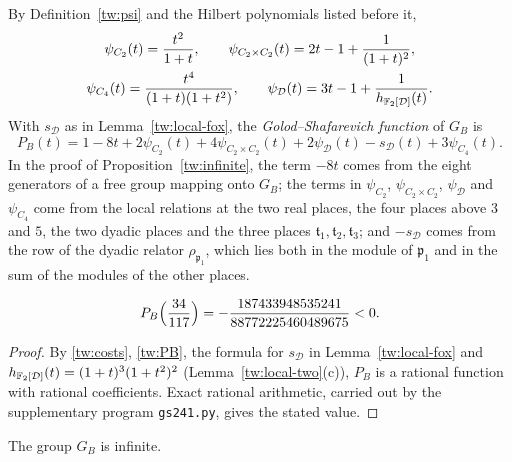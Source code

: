 By Definition~\ref{tw:psi} and the Hilbert polynomials listed before it,
\begin{equation}\label{tw:costs}
\begin{gathered}
 \psi_{C_2}(t)=\frac{t^2}{1+t},\qquad
 \psi_{C_2\times C_2}(t)=2t-1+\frac1{(1+t)^2},\\
 \psi_{C_4}(t)=\frac{t^4}{(1+t)(1+t^2)},\qquad
 \psi_{\mathcal D}(t)=3t-1+\frac1{h_{\mathbb F_2[\mathcal D]}(t)}.
\end{gathered}
\end{equation}
With $s_{\mathcal D}$ as in Lemma~\ref{tw:local-fox}, the \emph{Golod--Shafarevich
function} of $G_B$ is
\begin{equation}\label{tw:PB}
 P_B(t)=1-8t+2\psi_{C_2}(t)+4\psi_{C_2\times C_2}(t)+2\psi_{\mathcal D}(t)-s_{\mathcal D}(t)
 +3\psi_{C_4}(t).
\end{equation}
In the proof of Proposition~\ref{tw:infinite}, the term $-8t$ comes from the
eight generators of a free group mapping onto $G_B$; the terms in
$\psi_{C_2}$, $\psi_{C_2\times C_2}$, $\psi_{\mathcal D}$ and $\psi_{C_4}$ come from the
local relations at the two real places, the four places above $3$ and $5$,
the two dyadic places and the three places
$\mathfrak t_1,\mathfrak t_2,\mathfrak t_3$; and $-s_{\mathcal D}$ comes from the row of
the dyadic relator $\rho_{\mathfrak p_1}$, which lies both in the module of
$\mathfrak p_1$ and in the sum of the modules of the other places.

\begin{lemma}\label{tw:PB-value}
\[
 P_B\Bigl(\frac{34}{117}\Bigr)=-\frac{187433948535241}{88772225460489675}<0.
\]
\end{lemma}

\begin{proof}
By \eqref{tw:costs}, \eqref{tw:PB}, the formula for $s_{\mathcal D}$ in
Lemma~\ref{tw:local-fox} and $h_{\mathbb F_2[\mathcal D]}(t)=(1+t)^3(1+t^2)^2$
(Lemma~\ref{tw:local-two}(c)), $P_B$ is a rational function with rational
coefficients. Exact rational arithmetic, carried out by the supplementary
program \texttt{gs241.py}, gives the stated value.
\end{proof}

\begin{proposition}\label{tw:infinite}
The group $G_B$ is infinite.
\end{proposition}

